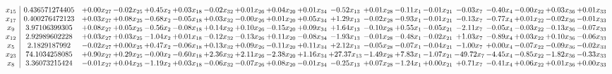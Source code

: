 \documentclass[9pt]{article}
\begin{document}
 \[\begin{array}{c| c c@{\hskip 2pt} c@{\hskip 2pt} c@{\hskip 2pt} c@{\hskip 2pt} c@{\hskip 2pt} c@{\hskip 2pt} c@{\hskip 2pt} c@{\hskip 2pt} c@{\hskip 2pt} c@{\hskip 2pt} c@{\hskip 2pt} c@{\hskip 2pt} c@{\hskip 2pt} c@{\hskip 2pt} c@{\hskip 2pt} c@{\hskip 2pt} c@{\hskip 2pt} }
 x_{15}   &  0.436571274405 & +  0.00 x_{27} & -0.02 x_{25} & +  0.45 x_{2} & +  0.03 x_{18} & -0.02 x_{32} & +  0.01 x_{26} & +  0.04 x_{20} & +  0.01 x_{34} & -0.52 x_{13} & +  0.01 x_{28} & -0.11 x_{1} & -0.01 x_{21} & -0.03 x_{7} & -0.40 x_{4} & -0.00 x_{22} & +  0.03 x_{36} & +  0.01 x_{33}\\
 x_{17}   &  0.400276472123 & +  0.03 x_{27} & +  0.08 x_{25} & -0.68 x_{2} & -0.05 x_{18} & +  0.03 x_{32} & -0.00 x_{26} & +  0.01 x_{20} & +  0.05 x_{34} & +  1.29 x_{13} & -0.02 x_{28} & -0.93 x_{1} & -0.01 x_{21} & -0.13 x_{7} & -0.77 x_{4} & +  0.01 x_{22} & -0.02 x_{36} & -0.01 x_{33}\\
 x_{9}   &  3.97106399305 & +  0.08 x_{27} & +  0.05 x_{25} & -0.56 x_{2} & -0.08 x_{18} & +  0.14 x_{32} & +  0.10 x_{26} & -0.15 x_{20} & +  0.09 x_{34} & +  1.64 x_{13} & -0.10 x_{28} & +  0.55 x_{1} & -0.05 x_{21} & -2.11 x_{7} & -0.05 x_{4} & -0.03 x_{22} & -0.13 x_{36} & -0.07 x_{33}\\
 x_{12}   &  2.92989602228 & +  0.03 x_{27} & +  0.03 x_{25} & -1.04 x_{2} & +  0.01 x_{18} & -0.12 x_{32} & -0.13 x_{26} & +  0.11 x_{20} & -0.08 x_{34} & -1.93 x_{13} & -0.01 x_{28} & -0.48 x_{1} & -0.02 x_{21} & +  1.03 x_{7} & -0.89 x_{4} & +  0.03 x_{22} & +  0.10 x_{36} & -0.06 x_{33}\\
 x_{5}   &  2.1829187992 & -0.02 x_{27} & +  0.00 x_{25} & +  0.47 x_{2} & -0.06 x_{18} & +  0.13 x_{32} & +  0.09 x_{26} & -0.11 x_{20} & +  0.11 x_{34} & +  2.12 x_{13} & -0.05 x_{28} & -0.07 x_{1} & -0.04 x_{21} & -1.00 x_{7} & +  0.00 x_{4} & -0.07 x_{22} & -0.09 x_{36} & -0.02 x_{33}\\
 x_{23}   &  74.1034258085 & +  0.90 x_{27} & +  0.29 x_{25} & -0.00 x_{2} & -0.60 x_{18} & +  2.36 x_{32} & +  2.11 x_{26} & -2.38 x_{20} & +  1.16 x_{34} & + 27.37 x_{13} & -1.49 x_{28} & +  7.83 x_{1} & -1.07 x_{21} & -49.72 x_{7} & -4.45 x_{4} & -0.85 x_{22} & -1.82 x_{36} & -0.33 x_{33}\\
 x_{8}   &  3.36073215424 & -0.01 x_{27} & +  0.04 x_{25} & -1.19 x_{2} & +  0.03 x_{18} & -0.06 x_{32} & -0.07 x_{26} & +  0.08 x_{20} & -0.01 x_{34} & -0.25 x_{13} & +  0.07 x_{28} & -1.24 x_{1} & +  0.00 x_{21} & +  0.71 x_{7} & -0.41 x_{4} & +  0.06 x_{22} & +  0.01 x_{36} & +  0.00 x_{33}\\

\end{array}\]
\end{document}

